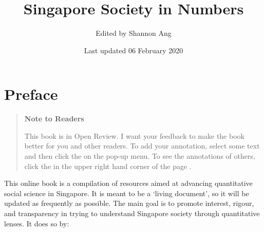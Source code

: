 \documentclass[openany]{book}
\title{Singapore Society in Numbers}
\author{Edited by Shannon Ang}
\date{Last updated 06 February 2020}
\begin{document}
\maketitle

{
\setcounter{tocdepth}{1}
\tableofcontents
}
\chapter*{Preface}\label{preface}

\begin{quote}
\textbf{Note to Readers}

This book is in Open Review. I want your feedback to make the book
better for you and other readers. To add your annotation, {select some
text} and then click the on the pop-up menu. To see the annotations of
others, click the in the upper right hand corner of the page .
\end{quote}

This online book is a compilation of resources aimed at advancing
quantitative social science in Singapore. It is meant to be a `living
document', so it will be updated as frequently as possible. The main
goal is to promote interest, rigour, and transparency in trying to
understand Singapore society through quantitative lenses. It does so by:
\end{document}
